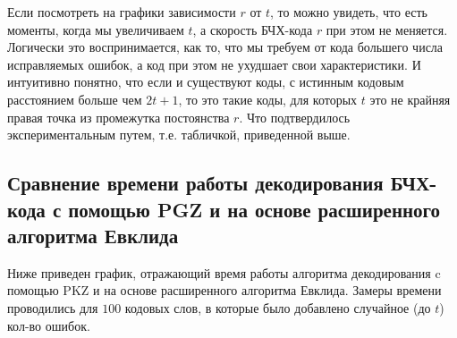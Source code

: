 \documentclass[12pt]{article}
\begin{document}
            Если посмотреть на графики зависимости $r$ от $t$, то можно увидеть, что есть моменты, когда мы увеличиваем $t$, а скорость БЧХ-кода $r$ при этом не меняется. Логически это воспринимается, как то, что мы требуем от кода большего числа исправляемых ошибок, а код при этом не ухудшает свои характеристики. И интуитивно понятно, что если и существуют коды, с истинным кодовым расстоянием больше чем $2t + 1$, то это такие коды, для которых $t$ это не крайняя правая точка из промежутка постоянства $r$. Что подтвердилось экспериментальным путем, т.е. табличкой, приведенной выше.

        \subsection{Сравнение времени работы декодирования БЧХ-кода с помощью PGZ и на основе расширенного алгоритма Евклида}
            Ниже приведен график, отражающий время работы алгоритма декодирования c помощью PKZ и на основе расширенного алгоритма Евклида. Замеры времени проводились для $100$ кодовых слов, в которые было добавлено случайное (до $t$) кол-во ошибок.
            \mydata
\end{document}

